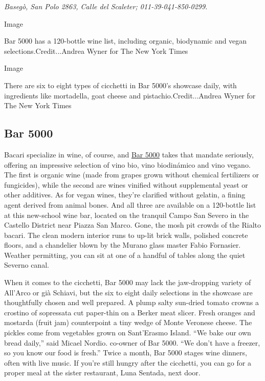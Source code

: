 \emph{Basegò, San Polo 2863, Calle del Scaleter; 011-39-041-850-0299.}

Image

Bar 5000 has a 120-bottle wine list, including organic, biodynamic and
vegan selections.Credit...Andrea Wyner for The New York Times

Image

There are six to eight types of cicchetti in Bar 5000's showcase daily,
with ingredients like mortadella, goat cheese and
pistachio.Credit...Andrea Wyner for The New York Times

\hypertarget{bar-5000}{%
\subsection{Bar 5000}\label{bar-5000}}

Bacari specialize in wine, of course, and
\href{http://www.lunasentada.it/home}{Bar 5000} takes that mandate
seriously, offering an impressive selection of vino bio, vino
biodinámico and vino vegano. The first is organic wine (made from grapes
grown without chemical fertilizers or fungicides), while the second are
wines vinified without supplemental yeast or other additives. As for
vegan wines, they're clarified without gelatin, a fining agent derived
from animal bones. And all three are available on a 120-bottle list at
this new-school wine bar, located on the tranquil Campo San Severo in
the Castello District near Piazza San Marco. Gone, the mosh pit crowds
of the Rialto bacari. The clean modern interior runs to up-lit brick
walls, polished concrete floors, and a chandelier blown by the Murano
glass master Fabio Fornasier. Weather permitting, you can sit at one of
a handful of tables along the quiet Severno canal.

When it comes to the cicchetti, Bar 5000 may lack the jaw-dropping
variety of All'Arco or già Schiavi, but the six to eight daily
selections in the showcase are thoughtfully chosen and well prepared. A
plump salty sun-dried tomato crowns a crostino of sopressata cut
paper-thin on a Berker meat slicer. Fresh oranges and mostarda (fruit
jam) counterpoint a tiny wedge of Monte Veronese cheese. The pickles
come from vegetables grown on Sant'Erasmo Island. ``We bake our own
bread daily,'' said Micael Nordio. co-owner of Bar 5000. ``We don't have
a freezer, so you know our food is fresh.'' Twice a month, Bar 5000
stages wine dinners, often with live music. If you're still hungry after
the cicchetti, you can go for a proper meal at the sister restaurant,
Luna Sentada, next door.


